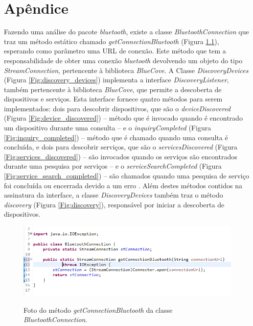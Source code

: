 \chapter{Apêndice}\label{apendicea}

Fazendo uma análise do pacote \textit{bluetooth}, existe a classe \textit{BluetoothConnection} que traz um método estático chamado \textit{getConnectionBluetooth} (Figura \ref{Fig:get_connection_bluetooth}), esperando como parâmetro uma URL de conexão. Este método que tem a responsabilidade de obter uma conexão \textit{bluetooth} devolvendo um objeto do tipo \textit{StreamConnection}, pertencente à biblioteca \textit{BlueCove}. A Classe \textit{DiscoveryDevices} (Figura \ref{Fig:discovery_devices}) implementa a interface \textit{DiscoveryListener}, também pertencente à biblioteca \textit{BlueCove}, que permite a descoberta de dispositivos e serviços. Esta interface fornece quatro métodos para serem implementados: dois para descobrir dispositivos, que são o \textit{deviceDiscovered} (Figura \ref{Fig:device_discovered}) – método que é invocado quando é encontrado um dispositivo durante uma consulta – e o \textit{inquiryCompleted} (Figura \ref{Fig:inquiry_completed}) – método que é chamado quando uma consulta é concluída, e dois para descobrir serviços, que são o \textit{servicesDiscovered} (Figura \ref{Fig:services_discovered}) – são invocados quando os serviços são encontrados durante uma pesquisa por serviços – e o \textit{serviceSearchCompleted} (Figura \ref{Fig:service_search_completed}) – são chamados quando uma pesquisa de serviço foi concluída ou encerrada devido a um erro \cite{bluecovedoc}. Além destes métodos contidos na assinatura da interface, a classe \textit{DiscoveryDevices} também traz o método \textit{discovery} (Figura \ref{Fig:discovery}), responsável por iniciar a descoberta de dispositivos.

\begin{figure}[!ht]
\centering
\caption{Foto do método \textit{getConnectionBluetooth} da classe \textit{BluetoothConnection}.} 
{\includegraphics[scale=.80]{imagens/pacoteBluetooth-BluetoothConnection.png}}\\
 \label{Fig:get_connection_bluetooth}
\end{figure}

